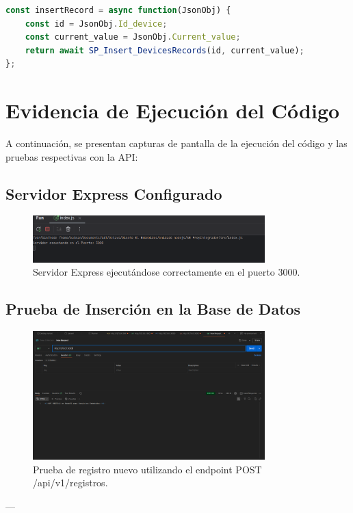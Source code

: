 \documentclass[12pt]{article}
\begin{document}
\begin{lstlisting}[language=JavaScript]
const insertRecord = async function(JsonObj) {
    const id = JsonObj.Id_device;
    const current_value = JsonObj.Current_value;
    return await SP_Insert_DevicesRecords(id, current_value);
};
\end{lstlisting}

\section{Evidencia de Ejecución del Código}
A continuación, se presentan capturas de pantalla de la ejecución del código y las pruebas respectivas con la API:

\subsection{Servidor Express Configurado}
\begin{figure}[h!]
    \centering
    \includegraphics[width=0.8\textwidth]{server_running}
    \caption{Servidor Express ejecutándose correctamente en el puerto 3000.}
\end{figure}

\subsection{Prueba de Inserción en la Base de Datos}
\begin{figure}[h!]
    \centering
    \includegraphics[width=0.8\textwidth]{postman_evidence}
    \caption{Prueba de registro nuevo utilizando el endpoint POST /api/v1/registros.}
\end{figure}

---
\end{document}
